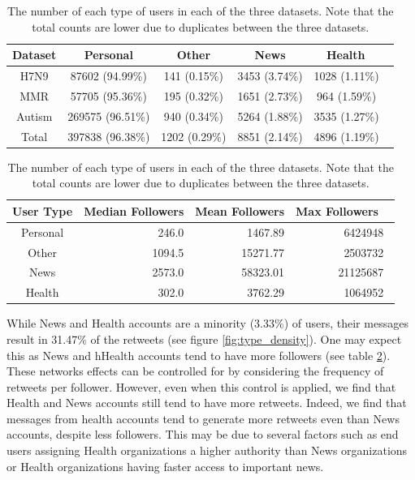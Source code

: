 \begin{table}
\centering
\begin{tabular}{c|cccc} \hline
Dataset & Personal & Other & News & Health \ \\ \hline 
H7N9 & 87602 (94.99\%) & 141 (0.15\%) & 3453 (3.74\%) & 1028 (1.11\%) \ \\ 
MMR & 57705 (95.36\%) & 195 (0.32\%) & 1651 (2.73\%) & 964 (1.59\%) \ \\ 
Autism &  269575 (96.51\%) & 940 (0.34\%) & 5264 (1.88\%) & 3535 (1.27\%) \ \\ \hline
Total &  397838 (96.38\%) & 1202 (0.29\%)  & 8851 (2.14\%) & 4896 (1.19\%) \ \\ 
\end{tabular}
\caption{The number of each type of users in each of the three datasets. Note that the total counts are lower due to duplicates between the three datasets.}
\label{table:userCounts}
\end{table}

\begin{table}
\centering
\begin{tabular}{c|rrr} \hline
User Type & Median Followers & Mean Followers & Max Followers  \ \\ \hline 
Personal & 246.0 & 1467.89   &  6424948\ \\ 
Other & 1094.5 & 15271.77 &  2503732\ \\ 
News & 2573.0 & 58323.01 & 21125687\ \\ 
Health & 302.0 & 3762.29 &   1064952\ \\ 
\end{tabular}
\caption{The number of each type of users in each of the three datasets. Note that the total counts are lower due to duplicates between the three datasets.}
\label{table:followerInfo}
\end{table}



While News and Health accounts are a minority (3.33\%) of users, their messages result in 31.47\% of the retweets (see figure \ref{fig:type_density}). One may expect this as News and hHealth accounts tend to have more followers (see table \ref{table:followerInfo}). These networks effects can be controlled for by considering the frequency of retweets per follower. However, even when this control is applied, we find that Health and News accounts still tend to have more retweets. Indeed, we find that messages from health accounts tend to generate more retweets even than News accounts, despite less followers. This may be due to several factors such as end users assigning Health organizations a higher authority than News organizations or Health organizations having faster access to important news. 

